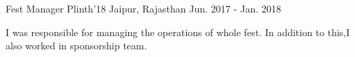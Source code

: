 \begin{cventries}
  \cventry
    {Fest Manager} %
    {Plinth'18} %
    {Jaipur, Rajasthan} %
    {Jun. 2017 - Jan. 2018} %
    {
      \begin{cvitems} %
        \item {I was responsible for managing the operations of whole fest. In addition to this,I also worked in sponsorship team.}
      \end{cvitems}
    }


\end{cventries}
